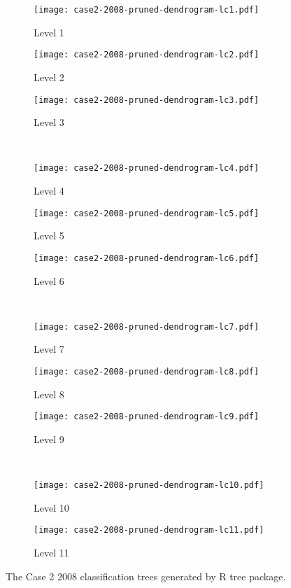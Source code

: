 \begin{appendices}

\begin{figure}[!ht] \centering
	\captionsetup[subfigure]{width=2.0in}
	\begin{subfigure}[t]{0.32\textwidth}
		\texttt{[image: case2-2008-pruned-dendrogram-lc1.pdf]}
		\caption{Level 1}
	\end{subfigure}
	\begin{subfigure}[t]{0.32\textwidth}
		\texttt{[image: case2-2008-pruned-dendrogram-lc2.pdf]}
		\caption{Level 2}
	\end{subfigure}
	\begin{subfigure}[t]{0.32\textwidth}
		\texttt{[image: case2-2008-pruned-dendrogram-lc3.pdf]}
		\caption{Level 3}
	\end{subfigure}\\
	\vspace{5pt}
	\begin{subfigure}[t]{0.32\textwidth}
		\texttt{[image: case2-2008-pruned-dendrogram-lc4.pdf]}
		\caption{Level 4}
	\end{subfigure}
	\begin{subfigure}[t]{0.32\textwidth}
		\texttt{[image: case2-2008-pruned-dendrogram-lc5.pdf]}
		\caption{Level 5}
	\end{subfigure}
	\begin{subfigure}[t]{0.32\textwidth}
		\texttt{[image: case2-2008-pruned-dendrogram-lc6.pdf]}
		\caption{Level 6}
	\end{subfigure}\\
	\vspace{5pt}	
	\begin{subfigure}[t]{0.32\textwidth}
		\texttt{[image: case2-2008-pruned-dendrogram-lc7.pdf]}
		\caption{Level 7}
	\end{subfigure}
	\begin{subfigure}[t]{0.32\textwidth}
		\texttt{[image: case2-2008-pruned-dendrogram-lc8.pdf]}
		\caption{Level 8}
	\end{subfigure}
	\begin{subfigure}[t]{0.32\textwidth}
		\texttt{[image: case2-2008-pruned-dendrogram-lc9.pdf]}
		\caption{Level 9}
	\end{subfigure}\\
	\vspace{5pt}
	\begin{subfigure}[t]{0.32\textwidth}
		\texttt{[image: case2-2008-pruned-dendrogram-lc10.pdf]}
		\caption{Level 10}
	\end{subfigure}
	\begin{subfigure}[t]{0.32\textwidth}
		\texttt{[image: case2-2008-pruned-dendrogram-lc11.pdf]}
		\caption{Level 11}
	\end{subfigure}
	\vspace{5pt}
	\caption[The Case 2 2008 classification trees generated by R tree package.]{The Case 2 2008 classification trees generated by R tree package.}
	\label{fig: appendix-fig.c11.tree}
\end{figure}


\end{appendices}
